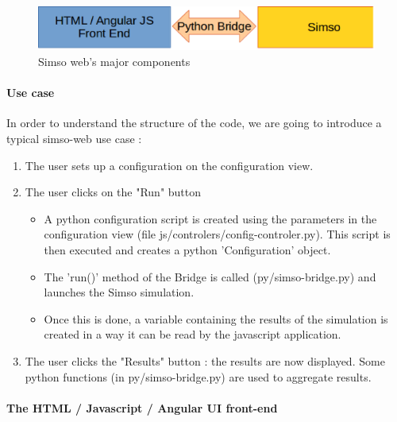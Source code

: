 \documentclass[10pt,a4paper]{article}
\begin{document}
\begin{figure}[h]
\centering
\includegraphics[scale=0.50]{figure1.eps}
\caption{Simso web's major components}
\end{figure}

\paragraph{Use case}
In order to understand the structure of the code, we are going to introduce a typical simso-web use case :
\begin{enumerate}
\item The user sets up a configuration on the configuration view.
\item The user clicks on the "Run" button
	\begin{itemize}
	\item A python configuration script is created using the parameters in the configuration view (file js/controlers/config-controler.py). This script is then executed and creates a python 'Configuration' object.
	\item The 'run()' method of the Bridge is called (py/simso-bridge.py) and launches the Simso simulation.
	\item Once this is done, a variable containing the results of the simulation is created in a way it can be read by the javascript application.
	\end{itemize}
\item The user clicks the "Results" button : the results are now displayed. Some python functions (in py/simso-bridge.py) are used to aggregate results.
\end{enumerate}

\paragraph{The HTML / Javascript / Angular UI front-end}
\end{document}

